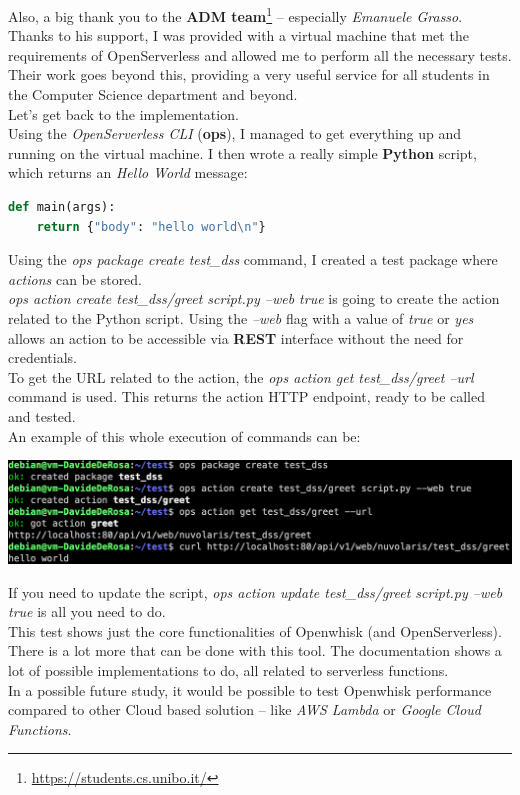 Also, a big thank you to the \textbf{ADM team}\footnote{\url{https://students.cs.unibo.it/}} -- especially \textit{Emanuele Grasso}. Thanks to his support, I was provided with a virtual machine that met the requirements of OpenServerless and allowed me to perform all the necessary tests. Their work goes beyond this, providing a very useful service for all students in the Computer Science department and beyond.\vspace{14pt}\\
Let's get back to the implementation.\vspace{14pt}\\
Using the \textit{OpenServerless CLI} (\textbf{ops}), I managed to get everything up and running on the virtual machine. I then wrote a really simple \textbf{Python} script, which returns an \textit{Hello World} message:
\begin{lstlisting}[language=python]
def main(args):
    return {"body": "hello world\n"}
\end{lstlisting}
Using the \textit{ops package create test\_dss} command, I created a test package where \textit{actions} can be stored.\vspace{14pt}\\
\textit{ops action create test\_dss/greet script.py --web true} is going to create the action related to the Python script. Using the \textit{--web} flag with a value of \textit{true} or \textit{yes} allows an action to be accessible via \textbf{REST} interface without the need for credentials.\vspace{14pt}\\
To get the URL related to the action, the \textit{ops action get test\_dss/greet --url} command is used. This returns the action HTTP endpoint, ready to be called and tested.\vspace{14pt}\\
An example of this whole execution of commands can be:
\begin{center}
    \includegraphics[width=1\textwidth]{img/demo.png}
\end{center}
If you need to update the script, \textit{ops action update test\_dss/greet script.py --web true} is all you need to do.\vspace{14pt}\\
This test shows just the core functionalities of Openwhisk (and OpenServerless). There is a lot more that can be done with this tool. The documentation shows a lot of possible implementations to do, all related to serverless functions.\vspace{14pt}\\
In a possible future study, it would be possible to test Openwhisk performance compared to other Cloud based solution -- like \textit{AWS Lambda} or \textit{Google Cloud Functions}.